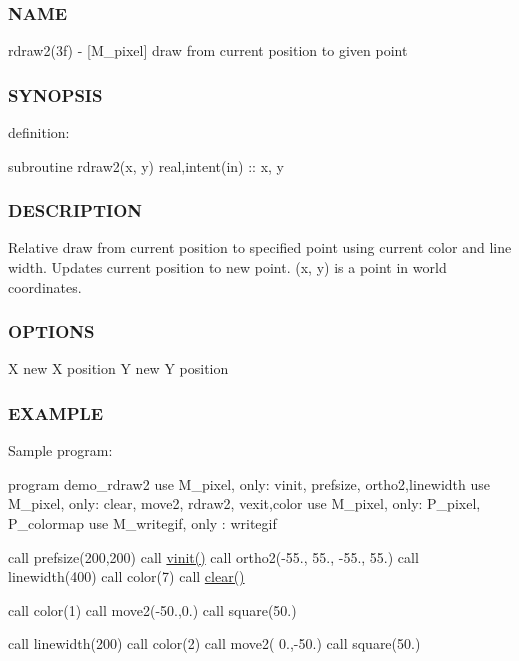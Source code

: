 \subsubsection*{N\+A\+ME}

rdraw2(3f) -\/ \mbox{[}M\+\_\+pixel\mbox{]} draw from current position to given point 

\subsubsection*{S\+Y\+N\+O\+P\+S\+IS}

definition\+:

subroutine rdraw2(x, y) real,intent(in) \+:\+: x, y

\subsubsection*{D\+E\+S\+C\+R\+I\+P\+T\+I\+ON}

Relative draw from current position to specified point using current color and line width. Updates current position to new point. (x, y) is a point in world coordinates.

\subsubsection*{O\+P\+T\+I\+O\+NS}

X new X position Y new Y position

\subsubsection*{E\+X\+A\+M\+P\+LE}

Sample program\+:

program demo\+\_\+rdraw2 use M\+\_\+pixel, only\+: vinit, prefsize, ortho2,linewidth use M\+\_\+pixel, only\+: clear, move2, rdraw2, vexit,color use M\+\_\+pixel, only\+: P\+\_\+pixel, P\+\_\+colormap use M\+\_\+writegif, only \+: writegif

call prefsize(200,200) call \hyperlink{namespacem__pixel_ac03ca8f23fdadb60599b6ea4dc87a6d9}{vinit()} call ortho2(-\/55., 55., -\/55., 55.) call linewidth(400) call color(7) call \hyperlink{namespacem__pixel_af3b81a21a0b2f6b5eddd09c031bd6173}{clear()}

call color(1) call move2(-\/50.,0.) call square(50.)

call linewidth(200) call color(2) call move2( 0.,-\/50.) call square(50.)

